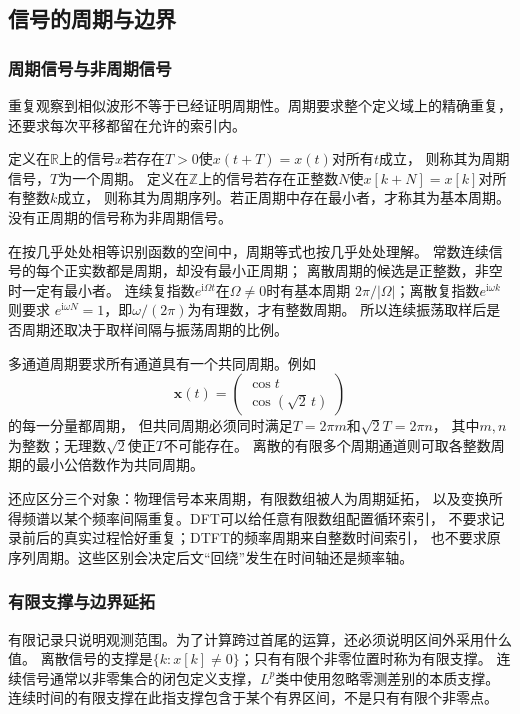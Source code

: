\subsection{信号的周期与边界}

\subsubsection{周期信号与非周期信号}

重复观察到相似波形不等于已经证明周期性。周期要求整个定义域上的精确重复，
还要求每次平移都留在允许的索引内。
\begin{definition}[周期及基本周期]
  \label{def:signal-period}
  定义在$\mathbb R$上的信号$x$若存在$T>0$使$x(t+T)=x(t)$对所有$t$成立，
  则称其为周期信号，$T$为一个周期。
  定义在$\mathbb Z$上的信号若存在正整数$N$使$x[k+N]=x[k]$对所有整数$k$成立，
  则称其为周期序列。若正周期中存在最小者，才称其为基本周期。
  没有正周期的信号称为非周期信号。
\end{definition}

在按几乎处处相等识别函数的空间中，周期等式也按几乎处处理解。
常数连续信号的每个正实数都是周期，却没有最小正周期；
离散周期的候选是正整数，非空时一定有最小者。
连续复指数$e^{\mathrm i\Omega t}$在$\Omega\neq0$时有基本周期
$2\pi/|\Omega|$；离散复指数$e^{\mathrm i\omega k}$则要求
$e^{\mathrm i\omega N}=1$，即$\omega/(2\pi)$为有理数，才有整数周期。
所以连续振荡取样后是否周期还取决于取样间隔与振荡周期的比例。

多通道周期要求所有通道具有一个共同周期。例如
\[
  \bm x(t)=\begin{pmatrix}\cos t\\\cos(\sqrt2\,t)\end{pmatrix}
\]
的每一分量都周期，
但共同周期必须同时满足$T=2\pi m$和$\sqrt2 T=2\pi n$，
其中$m,n$为整数；无理数$\sqrt2$使正$T$不可能存在。
离散的有限多个周期通道则可取各整数周期的最小公倍数作为共同周期。

还应区分三个对象：物理信号本来周期，有限数组被人为周期延拓，
以及变换所得频谱以某个频率间隔重复。DFT可以给任意有限数组配置循环索引，
不要求记录前后的真实过程恰好重复；DTFT的频率周期来自整数时间索引，
也不要求原序列周期。这些区别会决定后文“回绕”发生在时间轴还是频率轴。

\subsubsection{有限支撑与边界延拓}

有限记录只说明观测范围。为了计算跨过首尾的运算，还必须说明区间外采用什么值。
离散信号的支撑是$\{k:x[k]\neq0\}$；只有有限个非零位置时称为有限支撑。
连续信号通常以非零集合的闭包定义支撑，$L^p$类中使用忽略零测差别的本质支撑。
连续时间的有限支撑在此指支撑包含于某个有界区间，不是只有有限个非零点。

